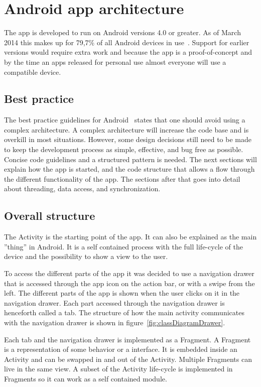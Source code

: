 \section{Android app architecture}
\label{sec:arch_app}
The app is developed to run on Android versions 4.0 or greater. As of March 2014 this makes up for 79,7\% of all Android devices in use~\cite{AndroidDeviceFragmentation}.
Support for earlier versions would require extra work and because the app is a proof-of-concept and by the time an apps released for personal use almost everyone will use a compatible device.


\subsection{Best practice}
The best practice guidelines for Android~\cite{androidPracticePerformance} states that one should avoid using a complex architecture. A complex architecture will increase the code base and is overkill in most situations. However, some design decisions still need to be made to keep the development process as simple, effective, and bug free as possible. Concise code guidelines and a structured pattern is needed. The next sections will explain how the app is started, and the code structure that allows a flow through the different functionality of the app. The sections after that goes into detail about threading, data access, and synchronization.

\subsection{Overall structure}
The Activity is the starting point of the app. It can also be explained as the main ''thing'' in Android. It is a self contained process with the full life-cycle of the device and the possibility to show a view to the user.

To access the different parts of the app it was decided to use a navigation drawer that is accessed through the app icon on the action bar, or with a swipe from the left. The different parts of the app is shown when the user clicks on it in the navigation drawer. Each part accessed through the navigation drawer is henceforth called a tab. The structure of how the main activity communicates with the navigation drawer is shown in figure~\ref{fig:classDiagramDrawer}.

Each tab and the navigation drawer is implemented as a Fragment. A Fragment is a representation of some behavior or a interface. It is embedded inside an Activity and can be swapped in and out of the Activity. Multiple Fragments can live in the same view. A subset of the Activity life-cycle is implemented in Fragments so it can work as a self contained module. 

